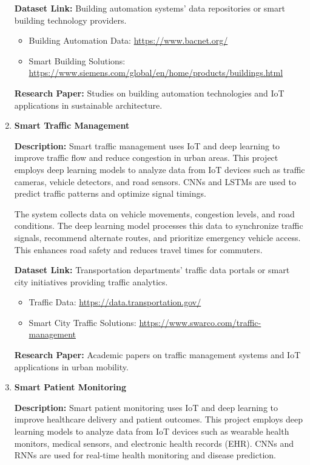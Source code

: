 \documentclass{article}
\begin{document}
\begin{enumerate}[label=\textbf{\arabic*.}, leftmargin=*]
\textbf{Dataset Link:} Building automation systems' data repositories or smart building technology providers.
\begin{itemize}
    \item Building Automation Data: \url{https://www.bacnet.org/}
    \item Smart Building Solutions: \url{https://www.siemens.com/global/en/home/products/buildings.html}
\end{itemize}

\textbf{Research Paper:} Studies on building automation technologies and IoT applications in sustainable architecture.

\item \textbf{Smart Traffic Management}

\textbf{Description:}
Smart traffic management uses IoT and deep learning to improve traffic flow and reduce congestion in urban areas. This project employs deep learning models to analyze data from IoT devices such as traffic cameras, vehicle detectors, and road sensors. CNNs and LSTMs are used to predict traffic patterns and optimize signal timings.

The system collects data on vehicle movements, congestion levels, and road conditions. The deep learning model processes this data to synchronize traffic signals, recommend alternate routes, and prioritize emergency vehicle access. This enhances road safety and reduces travel times for commuters.

\textbf{Dataset Link:} Transportation departments' traffic data portals or smart city initiatives providing traffic analytics.
\begin{itemize}
    \item Traffic Data: \url{https://data.transportation.gov/}
    \item Smart City Traffic Solutions: \url{https://www.swarco.com/traffic-management}
\end{itemize}

\textbf{Research Paper:} Academic papers on traffic management systems and IoT applications in urban mobility.

\item \textbf{Smart Patient Monitoring}

\textbf{Description:}
Smart patient monitoring uses IoT and deep learning to improve healthcare delivery and patient outcomes. This project employs deep learning models to analyze data from IoT devices such as wearable health monitors, medical sensors, and electronic health records (EHR). CNNs and RNNs are used for real-time health monitoring and disease prediction.


\end{enumerate}
\end{document}
